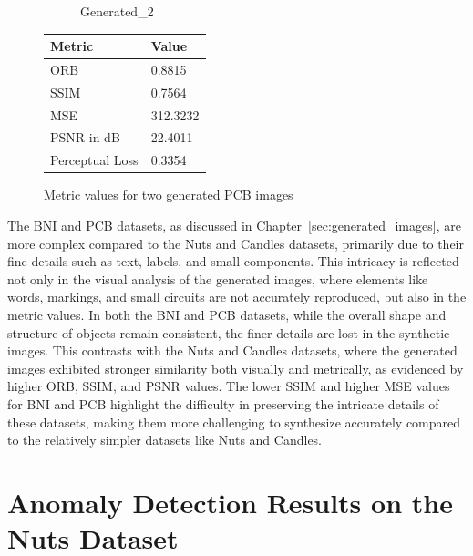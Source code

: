 \documentclass[12pt,DIV14,BCOR12mm,a4paper,footinclude=false,headinclude,parskip=half-,twoside,openright,cleardoublepage=empty,toc=index,bibliography=totoc,listof=totoc]{scrreprt}
\numberwithin{equation}{chapter}
\begin{document}
\begin{figure}
\begin{minipage}[H]{\linewidth}
\begin{minipage}[H]{0.5\linewidth}
\begin{subfigure}[t]{0.48\linewidth}
                \caption{Generated\_2}
            \end{subfigure}
        \end{minipage}%
        \hfill
        \begin{minipage}[H]{0.5\linewidth} %
            \centering
            \small
            \begin{tabular}{p{3cm} p{2cm}}
                \toprule
                \textbf{Metric} & \textbf{Value} \\
                \midrule
                ORB             & 0.8815        \\
                SSIM            & 0.7564        \\
                MSE             & 312.3232      \\
                PSNR in dB      & 22.4011       \\
                Perceptual Loss & 0.3354        \\
                \bottomrule
            \end{tabular}
        \end{minipage}%
        \caption{Metric values for two generated PCB images}
        \label{fig:comparison_generated_1_1_generated_1_2_pcb}
    \end{minipage}
\end{figure}


The BNI and PCB datasets, as discussed in Chapter~\ref{sec:generated_images}, are more complex compared to the Nuts and Candles datasets, primarily due to their fine details such as text, labels, and small components. This intricacy is reflected not only in the visual analysis of the generated images, where elements like words, markings, and small circuits are not accurately reproduced, but also in the metric values. In both the BNI and PCB datasets, while the overall shape and structure of objects remain consistent, the finer details are lost in the synthetic images. This contrasts with the Nuts and Candles datasets, where the generated images exhibited stronger similarity both visually and metrically, as evidenced by higher ORB, SSIM, and PSNR values. The lower SSIM and higher MSE values for BNI and PCB highlight the difficulty in preserving the intricate details of these datasets, making them more challenging to synthesize accurately compared to the relatively simpler datasets like Nuts and Candles.

\section{Anomaly Detection Results on the Nuts Dataset}
\end{document}
